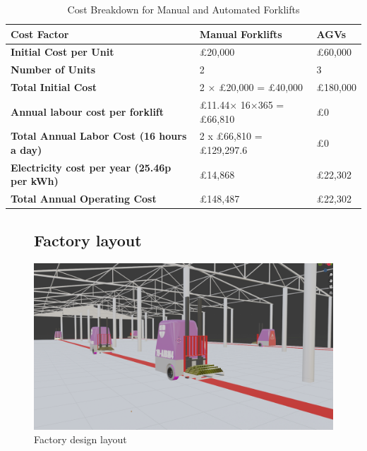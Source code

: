 \documentclass[12pt]{article}
\begin{document}
\begin{table}[htbp]
\centering
\begin{tabular}{|l|l|l|}
\hline
\textbf{Cost Factor}                   & \textbf{Manual Forklifts}           & \textbf{AGVs } \\ \hline
\textbf{Initial Cost per Unit}          & £20,000                             & £60,000                               \\ \hline
\textbf{Number of Units}                & 2                                    & 3                                     \\ \hline
\textbf{Total Initial Cost}             & 2 × £20,000 = £40,000               & £180,000                \\ \hline
\textbf{Annual labour cost per forklift }& £11.44× 16×365 = £66,810      & £0                                    \\ \hline
\textbf{Total Annual Labor Cost (16 hours a day)}        & 2 x £66,810 = £129,297.6    & £0                                    \\ \hline
 \textbf{Electricity cost per year (25.46p per kWh) } & £14,868&£22,302\\\hline  
 
\textbf{Total Annual Operating Cost}    & £148,487& £22,302\\ \hline
 
  
\end{tabular}

\caption{Cost Breakdown for Manual and Automated Forklifts}
\end{table}


 


\FloatBarrier
\begin{figure}[ht]
\subsection{Factory layout }
\centering
\includegraphics[width=1\linewidth]{factory layout1.png}
\caption{Factory design layout}
\label{fig:factory_layout}
\end{figure}
\end{document}
